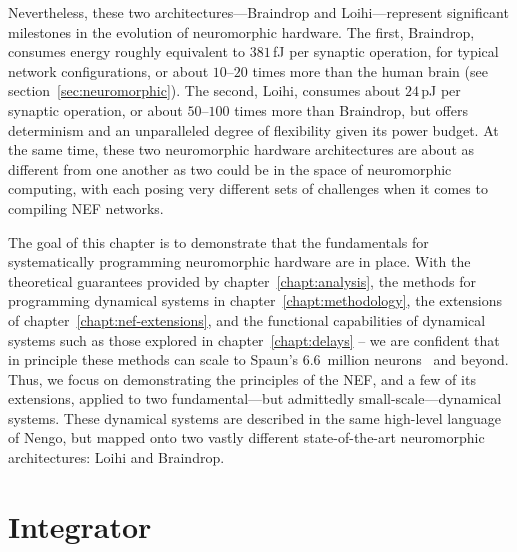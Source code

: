 Nevertheless, these two architectures---Braindrop and Loihi---represent significant milestones in the evolution of neuromorphic hardware.
The first, Braindrop, consumes energy roughly equivalent to $381$\,fJ per synaptic operation, for typical network configurations, or about $10$--$20$ times more than the human brain (see section~\ref{sec:neuromorphic}).
The second, Loihi, consumes about $24$\,pJ per synaptic operation, or about $50$--$100$ times more than Braindrop, but offers determinism and an unparalleled degree of flexibility given its power budget.
At the same time, these two neuromorphic hardware architectures are about as different from one another as two could be in the space of neuromorphic computing, with each posing very different sets of challenges when it comes to compiling NEF networks.

The goal of this chapter is to demonstrate that the fundamentals for systematically programming neuromorphic hardware are in place.
With the theoretical guarantees provided by chapter~\ref{chapt:analysis}, the methods for programming dynamical systems in chapter~\ref{chapt:methodology}, the extensions of chapter~\ref{chapt:nef-extensions}, and the functional capabilities of dynamical systems such as those explored in chapter~\ref{chapt:delays} -- we are confident that in principle these methods can scale to Spaun's 6.6~million neurons~\citep{choo2018} and beyond.
Thus, we focus on demonstrating the principles of the NEF, and a few of its extensions, applied to two fundamental---but admittedly small-scale---dynamical systems.
These dynamical systems are described in the same high-level language of Nengo, but mapped onto two vastly different state-of-the-art neuromorphic architectures: Loihi and Braindrop.

\section{Integrator}
\label{sec:integrator}

